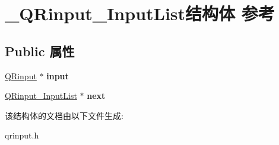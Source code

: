 \hypertarget{struct___q_rinput___input_list}{\section{\-\_\-\-Q\-Rinput\-\_\-\-Input\-List结构体 参考}
\label{struct___q_rinput___input_list}
}
\subsection*{Public 属性}
\begin{DoxyCompactItemize}
\item 
\hypertarget{struct___q_rinput___input_list_ae8c7eebe23d1033e193195f6dea36d97}{\hyperlink{struct___q_rinput}{Q\-Rinput} $\ast$ {\bfseries input}}\label{struct___q_rinput___input_list_ae8c7eebe23d1033e193195f6dea36d97}

\item 
\hypertarget{struct___q_rinput___input_list_a46c3a7b29f71a09746191d8afb8e20fd}{\hyperlink{struct___q_rinput___input_list}{Q\-Rinput\-\_\-\-Input\-List} $\ast$ {\bfseries next}}\label{struct___q_rinput___input_list_a46c3a7b29f71a09746191d8afb8e20fd}

\end{DoxyCompactItemize}


该结构体的文档由以下文件生成\-:\begin{DoxyCompactItemize}
\item 
qrinput.\-h\end{DoxyCompactItemize}
